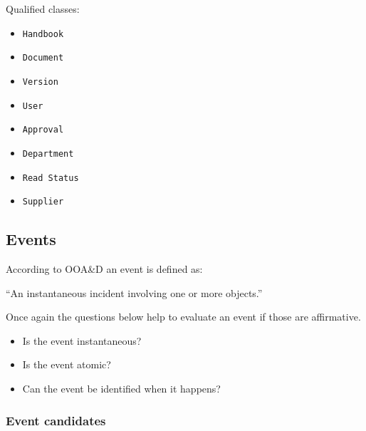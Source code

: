 Qualified classes:
\begin{itemize} %
	\item \texttt{Handbook}
	\item \texttt{Document}
	\item \texttt{Version}
	\item \texttt{User}
	\item \texttt{Approval}
	\item \texttt{Department}
	\item \texttt{Read Status}
	\item \texttt{Supplier}
\end{itemize}

\subsection{Events}

According to OOA\&D an event is defined as\citep[p.~53]{Rod-Aalborg}:

``An instantaneous incident involving one or more objects.''

Once again the questions below help to evaluate an event if those are affirmative\citep[p.~65]{Rod-Aalborg}.
\begin{itemize}
	\item Is the event instantaneous?
	\item Is the event atomic?
	\item Can the event be identified when it happens?
\end{itemize}

\subsubsection{Event candidates}

